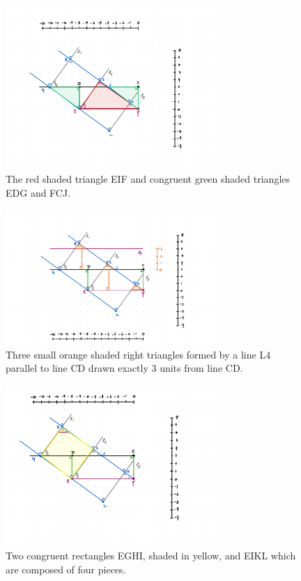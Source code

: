 \documentclass{article}
\begin{document}
\begin{figure}[ht]
    \centering
    \includegraphics[width=8cm]{Capstone Presentation/Draft Diagrams/4.png}
    
    \caption{The red shaded triangle EIF and congruent green shaded triangles EDG and FCJ.}
    \label{Fig_Step_4}
\end{figure}

\begin{figure}[ht]
    \centering
    \includegraphics[width=8cm]{Capstone Presentation/Draft Diagrams/5.png}
    \caption{Three small orange shaded right triangles formed by a line L4 parallel to line CD drawn exactly 3 units from line CD.}
    \label{Fig_Step_5}
\end{figure}

\begin{figure}[ht]
    \centering
    \includegraphics[width=8cm]{Capstone Presentation/Draft Diagrams/6.png}
    \caption{Two congruent rectangles EGHI, shaded in yellow, and EIKL which are composed of four pieces.}
    \label{Fig_Step_6}
\end{figure}
\end{document}
